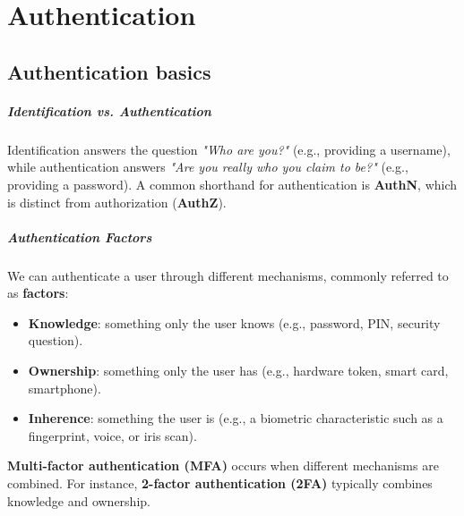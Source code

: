 \chapter[]{Authentication}
\section{Authentication basics}

\paragraph{Identification vs. Authentication}
Identification answers the question \textit{"Who are you?"} (e.g., providing a username), while authentication answers \textit{"Are you really who you claim to be?"} (e.g., providing a password).
A common shorthand for authentication is \textbf{AuthN}, which is distinct from authorization (\textbf{AuthZ}).

\paragraph{Authentication Factors}
We can authenticate a user through different mechanisms, commonly referred to as \textbf{factors}:
\begin{itemize}
    \item \textbf{Knowledge}: something only the user knows (e.g., password, PIN, security question).
    \item \textbf{Ownership}: something only the user has (e.g., hardware token, smart card, smartphone).
    \item \textbf{Inherence}: something the user is (e.g., a biometric characteristic such as a fingerprint, voice, or iris scan).
\end{itemize}
\textbf{Multi-factor authentication (MFA)} occurs when different mechanisms are combined. For instance, \textbf{2-factor authentication (2FA)} typically combines knowledge and ownership.

